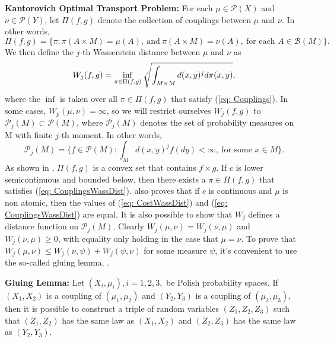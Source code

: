 \documentclass[10pt]{article}
\begin{document}
\noindent \textbf{Kantorovich Optimal Transport Problem:}
\noindent For each $\mu \in \mathcal{P}(X)$ and $\nu \in \mathcal{P}(Y)$, let $\Pi(f,g)$ denote the collection of couplings between $\mu$ and $\nu$. In other words, 
\begin{equation}
\Pi(f, g) = \Big\{\pi: \pi(A \times M) = \mu(A), \ \text{and} \ \pi(A \times M) = \nu(A), \ \text{for each $A \in \mathcal{B}(M)$}  \Big\}.
\label{eq: Couplings}
\end{equation}
We then define the $j$-th Wasserstein distance between $\mu$ and $\nu$ as 
\begin{equation}
W_j(f, g) = \inf_{\pi \in \Pi(f, g)}\sqrt[\leftroot{-2}\uproot{2}j]{\int_{M \times M} d(x,y)^{j} d\pi(x, y)},
\label{eq: CouplingsWassDist}
\end{equation}
where the $\inf$ is taken over all $\pi \in \Pi(f, g)$ that satisfy (\ref{eq: Couplings}). In some cases, $W_p(\mu, \nu) = \infty$, so we will restrict ourselves $W_j(f, g)$ to $\mathcal{P}_j(M) \subset \mathcal{P}(M)$, where $\mathcal{P}_j(M)$ denotes the set of probability measures on M with finite $j$-th moment. In other words, 
\begin{equation}
\mathcal{P}_j(M) = \Big\{f \in \mathcal{P}(M): \int_M d(x, y)^j f(dy) < \infty, \ \text{for some $x \in M$} \Big\}.
\label{eq: jPM}
\end{equation}
As shown in \cite{AN}, $\Pi(f, g)$ is a convex set that contains $f \times g$.  If $c$ is lower semicontinuous and bounded below, then there exists a $\pi \in \Pi(f, g)$ that satisfies (\ref{eq: CouplingsWassDist}). \cite{AN} also proves that if $c$ is continuous and $\mu$ is non atomic, then the values of (\ref{eq: CostWassDist}) and (\ref{eq: CouplingsWassDist}) are equal.
It is also possible to show that $W_{j}$ defines a distance function on $\mathcal{P}_j(M)$. Clearly $W_{j}(\mu, \nu) = W_{j}(\nu, \mu)$ and $W_{j}(\nu, \mu) \geq 0$, with equality only holding in the case that $\mu = \nu$. To prove that $W_{j}(\mu, \nu) \leq W_{j}(\nu, \psi) + W_{j}(\psi, \nu)$ for some measure $\psi$, it's convenient to use the so-called gluing lemma, \cite{CVillani}.

\noindent \textbf{Gluing Lemma:} Let $(X_i, \mu_i), i = 1, 2, 3,$ be Polish probability spaces. If $(X_1, X_2)$ is a coupling of $(\mu_1, \mu_2)$ and $(Y_2, Y_3) $ is a coupling of $(\mu_2, \mu_3)$, then it is possible to construct a triple of random variables $(Z_1, Z_2, Z_3)$ such that $(Z_1, Z_2)$ has the same law as $(X_1, X_2)$ and $(Z_2, Z_3)$ has the same law as $(Y_2, Y_3)$.
\end{document}
